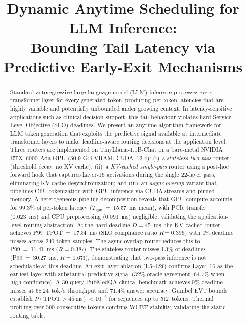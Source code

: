 \documentclass[conference]{IEEEtran}
\begin{document}
\title{Dynamic Anytime Scheduling for LLM Inference:\\
Bounding Tail Latency via Predictive Early-Exit Mechanisms}

\author{
}

\maketitle

\begin{abstract}
Standard autoregressive large language model (LLM) inference processes every
transformer layer for every generated token, producing per-token latencies
that are highly variable and potentially unbounded under growing context.
In latency-sensitive applications such as clinical decision support, this
tail behaviour violates hard Service-Level Objective (SLO) deadlines.
We present an anytime algorithm framework for LLM token generation that
exploits the predictive signal available at intermediate transformer layers
to make deadline-aware routing decisions at the application level.
Three routers are implemented on TinyLlama-1.1B-Chat on a bare-metal
NVIDIA RTX~6000~Ada GPU (50.9~GB VRAM, CUDA~12.4):
(i)~a \emph{stateless two-pass} router (threshold decay, no KV cache);
(ii)~a \emph{KV-cached single-pass} router using a post-hoc forward hook
     that captures Layer-16 activations during the single 22-layer pass,
     eliminating KV-cache desynchronization; and
(iii)~an \emph{async-overlap} variant that pipelines CPU tokenization with
      GPU inference via CUDA streams and pinned memory.
A heterogeneous pipeline decomposition reveals that GPU compute accounts
for 99.3\% of per-token latency ($T_{\text{gpu}}$~=~15.57~ms mean),
with PCIe transfer (0.023~ms) and CPU preprocessing (0.091~ms) negligible,
validating the application-level routing abstraction.
At the hard deadline $D=45$~ms, the KV-cached router achieves
P99~TPOT~=~17.84~ms (SLO compliance ratio $R = 0.396$) with 0\%
deadline misses across 240 token samples.
The async-overlap router reduces this to P99~=~17.41~ms ($R=0.387$).
The stateless router misses 1.3\% of deadlines (P99~=~30.27~ms, $R=0.673$),
demonstrating that two-pass inference is not schedulable at this deadline.
An exit-layer ablation (L5--L20) confirms Layer~16 as the earliest layer
with substantial predictive signal (32\% oracle agreement, 64.7\% when
high-confidence).
A 30-query PubMedQA clinical benchmark achieves 0\% deadline misses
at 68.24~tok/s throughput and 71.4\% answer accuracy.
Gumbel EVT bounds establish $P(\text{TPOT}>45\,\text{ms})<10^{-6}$
for sequences up to 512~tokens.
Thermal profiling over 500 consecutive tokens confirms WCET stability,
validating the static routing table.
\end{abstract}
\end{document}
